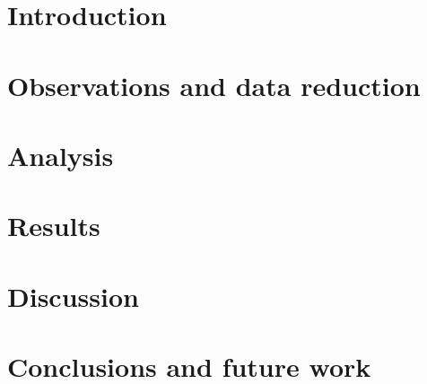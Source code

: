 \documentclass[twocolumn,tighten]{aastex62}
\newcommand{\mynote}[1]{
    {\sffamily\small\color{red}#1}
}
\begin{document}
\title{}

\author{Laurel Farris}

\author{R. T. James McAteer}


\begin{abstract}
    
\end{abstract}


\section{Introduction}\label{introduction}


\clearpage
\section{Observations and data reduction}\label{data}


\clearpage
\section{Analysis}\label{analysis}


\clearpage
\section{Results}\label{results}


\clearpage
\section{Discussion}\label{discussion}


\clearpage
\section{Conclusions and future work}\label{conclusions}



\clearpage

\end{document}
